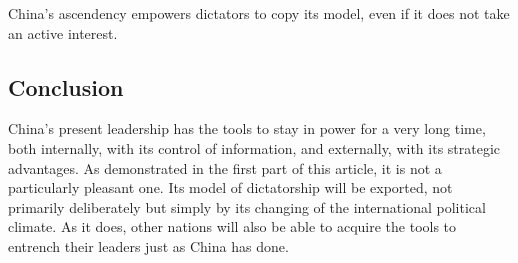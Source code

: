 China's ascendency empowers dictators to copy its model, even if it does
not take an active interest.

\subsection{Conclusion}\label{conclusion}

China's present leadership has the tools to stay in power for a very
long time, both internally, with its control of information, and
externally, with its strategic advantages. As demonstrated in the first
part of this article, it is not a particularly pleasant one. Its model
of dictatorship will be exported, not primarily deliberately but simply
by its changing of the international political climate. As it does,
other nations will also be able to acquire the tools to entrench their
leaders just as China has done.
